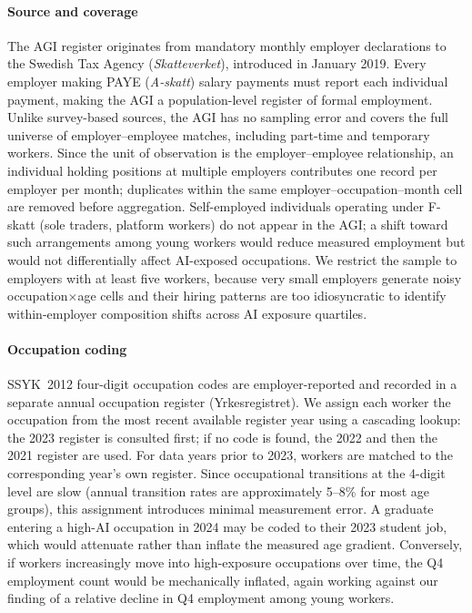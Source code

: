 \documentclass[preprint,12pt,authoryear]{elsarticle}
\begin{document}
\paragraph{Source and coverage}
The AGI register originates from mandatory monthly employer declarations to the Swedish Tax Agency (\emph{Skatteverket}), introduced in January 2019. Every employer making PAYE (\emph{A-skatt}) salary payments must report each individual payment, making the AGI a population-level register of formal employment. Unlike survey-based sources, the AGI has no sampling error and covers the full universe of employer--employee matches, including part-time and temporary workers. Since the unit of observation is the employer--employee relationship, an individual holding positions at multiple employers contributes one record per employer per month; duplicates within the same employer--occupation--month cell are removed before aggregation. Self-employed individuals operating under F-skatt (sole traders, platform workers) do not appear in the AGI; a shift toward such arrangements among young workers would reduce measured employment but would not differentially affect AI-exposed occupations. We restrict the sample to employers with at least five workers, because very small employers generate noisy occupation$\times$age cells and their hiring patterns are too idiosyncratic to identify within-employer composition shifts across AI exposure quartiles.

\paragraph{Occupation coding}
SSYK~2012 four-digit occupation codes are employer-reported and recorded in a separate annual occupation register (Yrkesregistret). We assign each worker the occupation from the most recent available register year using a cascading lookup: the 2023 register is consulted first; if no code is found, the 2022 and then the 2021 register are used. For data years prior to 2023, workers are matched to the corresponding year's own register. Since occupational transitions at the 4-digit level are slow (annual transition rates are approximately 5--8\% for most age groups), this assignment introduces minimal measurement error. A graduate entering a high-AI occupation in 2024 may be coded to their 2023 student job, which would attenuate rather than inflate the measured age gradient. Conversely, if workers increasingly move into high-exposure occupations over time, the Q4 employment count would be mechanically inflated, again working against our finding of a relative decline in Q4 employment among young workers.
\end{document}
